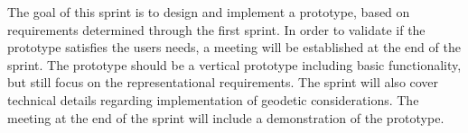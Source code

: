 The goal of this sprint is to design and implement a prototype, based on requirements determined through the first sprint. In order to validate if the prototype satisfies the users needs, a meeting will be established at the end of the sprint. The prototype should be a vertical prototype including basic functionality, but still focus on the representational requirements. The sprint will also cover technical details regarding implementation of geodetic considerations. The meeting at the end of the sprint will include a demonstration of the prototype.
